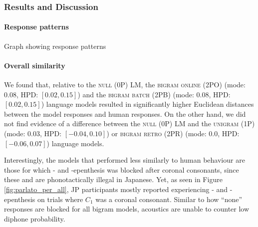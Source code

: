 
\subsubsection{Results and Discussion}

\paragraph{Response patterns}
{\color{red}Graph showing response patterns}


\paragraph{Overall similarity}
We found that, relative to the \textsc{null (0P)} LM, the \textsc{bigram online (2PO)} (mode: $0.08$, HPD: $[0.02, 0.15]$) and the \textsc{bigram batch (2PB)} (mode: $0.08$, HPD: $[0.02, 0.15]$) language models resulted in significantly higher Euclidean distances between the model responses and human responses. On the other hand, we did not find evidence of a difference between the \textsc{null (0P)} LM and the \textsc{unigram (1P)} (mode: $0.03$, HPD: $[-0.04, 0.10]$) or \textsc{bigram retro (2PR)} (mode: $0.0$, HPD: $[-0.06, 0.07]$) language models.

Interestingly, the models that performed less similarly to human behaviour are those for which - and -epenthesis was blocked after coronal consonants, since these  and  are phonotactically illegal in Japanese. Yet, as seen in Figure \ref{fig:parlato_per_all}, JP participants mostly reported experiencing - and -epenthesis on trials where $C_{1}$ was a coronal consonant. Similar to how ``none'' responses are blocked for all bigram models, acoustics are unable to counter low diphone probability.

